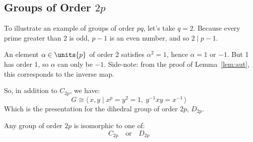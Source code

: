\subsection{Groups of Order \(2p\)}
To illustrate an example of groups of order \(pq\), let's take \(q = 2\).
Because every prime greater than 2 is odd, \(p - 1\) is an even number, and so \(2 \mid p - 1\).

An element \(\alpha \in \units{p}\) of order 2 satisfies \(\alpha^2 = 1\), hence \(\alpha = 1\) or \(-1\).
But 1 has order 1, so \(\alpha\) can only be \(-1\).
Side-note: from the proof of Lemma~\ref{lem:aut}, this corresponds to the inverse map.

So, in addition to \(C_{2p}\), we have:
\[G \cong \langle\, x, y \mid x^p = y^2 = 1,\ y^{-1}xy = x^{-1}\,\rangle\]
Which is the presentation for the dihedral group of order \(2p\), \(D_{2p}\).

\begin{mdframed}[align=center,nobreak=true]
    \begin{center}
        Any group of order \(2p\) is isomorphic to one of:
        \[C_{2p} \quad \text{or} \quad D_{2p}\]
    \end{center}
\end{mdframed}
